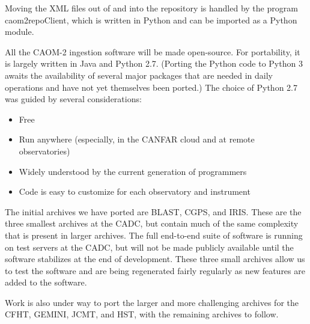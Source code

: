 Moving the XML files out of and into the repository is handled by the program caom2repoClient, which is written in Python and can be imported as a Python module.
 
All the CAOM-2 ingestion software will be made open-source.  For portability, it is largely written in Java and Python 2.7.  (Porting the Python code to Python 3 awaits the availability of several major packages that are needed in daily operations and have not yet themselves been ported.) 
The choice of Python 2.7 was guided by several considerations:
\begin{itemize}
\item Free
\item Run anywhere (especially, in the CANFAR cloud and at remote observatories)
\item Widely understood by the current generation of programmers
\item Code is easy to customize for each observatory and instrument
\end{itemize}

The initial archives we have ported are BLAST, CGPS, and IRIS.  These are the three smallest archives at the CADC, but contain much of the same complexity that is present in larger archives.  The full end-to-end suite of software is running on test servers at the CADC, but will not be made publicly available until the software stabilizes at the end of development.  These three small archives allow us to test the software and are being regenerated fairly regularly as new features are added to the software.

Work is also under way to port the larger and more challenging archives for the CFHT, GEMINI, JCMT, and HST, with the remaining archives to follow.


